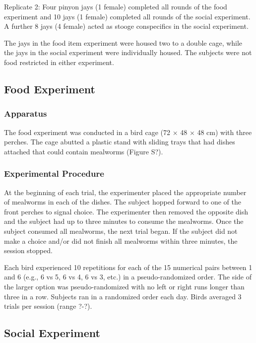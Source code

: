 \documentclass[
  ,doc,floatsintext]{apa6}
\begin{document}
Replicate 2: Four pinyon jays (1 female) completed all rounds of the food experiment and 10 jays (1 female) completed all rounds of the social experiment. A further 8 jays (4 female) acted as stooge conspecifics in the social experiment.

The jays in the food item experiment were housed two to a double cage, while the jays in the social experiment were individually housed. The subjects were not food restricted in either experiment.

\hypertarget{food-experiment}{%
\subsection{Food Experiment}\label{food-experiment}}

\hypertarget{apparatus}{%
\subsubsection{Apparatus}\label{apparatus}}

The food experiment was conducted in a bird cage (72 \(\times\) 48 \(\times\) 48 cm) with three perches. The cage abutted a plastic stand with sliding trays that had dishes attached that could contain mealworms (Figure S?).

\hypertarget{experimental-procedure}{%
\subsubsection{Experimental Procedure}\label{experimental-procedure}}

At the beginning of each trial, the experimenter placed the appropriate number of mealworms in each of the dishes. The subject hopped forward to one of the front perches to signal choice. The experimenter then removed the opposite dish and the subject had up to three minutes to consume the mealworms. Once the subject consumed all mealworms, the next trial began. If the subject did not make a choice and/or did not finish all mealworms within three minutes, the session stopped.

Each bird experienced 10 repetitions for each of the 15 numerical pairs between 1 and 6 (e.g., 6 vs 5, 6 vs 4, 6 vs 3, etc.) in a pseudo-randomized order. The side of the larger option was pseudo-randomized with no left or right runs longer than three in a row. Subjects ran in a randomized order each day. Birds averaged 3 trials per session (range ?-?).

\hypertarget{social-experiment}{%
\subsection{Social Experiment}\label{social-experiment}}
\end{document}
